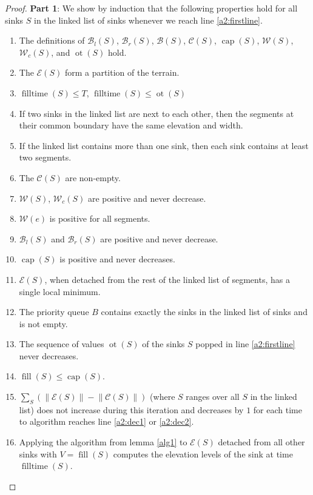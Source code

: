 \documentclass[11pt,a4paper]{article}
\newcommand{\norm}[1]{\left\lVert #1 \right\rVert}
\DeclareMathOperator{\capp}{cap}
\DeclareMathOperator{\ot}{ot}
\DeclareMathOperator{\Fill}{fill}
\DeclareMathOperator{\filltime}{filltime}
\begin{document}
\begin{proof}
\textbf{Part 1}:
We show by induction that the following properties hold for all sinks $S$ in the linked list of sinks whenever we reach line \ref{a2:firstline}.
\begin{enumerate}[label=\textbf{\Roman*}]
\item The definitions of $\mathcal{B}_l(S)$, $\mathcal{B}_r(S)$, $\mathcal{B}(S)$, $\mathcal{C}(S)$, $\capp(S)$, $\mathcal{W}(S)$, $\mathcal{W}_c(S)$, and $\ot(S)$ hold.\label{e1}
\item The $\mathcal{E}(S)$ form a partition of the terrain.\label{e2}
\item $\filltime(S) \le T$, $\filltime(S) \le \ot(S)$\label{e3}
\item If two sinks in the linked list are next to each other, then the segments at their common boundary have the same elevation and width.\label{e4} 
\item If the linked list contains more than one sink, then each sink contains at least two segments.\label{e6}
\item The $\mathcal{C}(S)$ are non-empty.\label{e7}
\item $\mathcal{W}(S)$, $\mathcal{W}_c(S)$ are positive and never decrease.\label{e8}
\item $\mathcal{W}(e)$ is positive for all segments.\label{e9}
\item $\mathcal{B}_l(S)$ and $\mathcal{B}_r(S)$ are positive and never decrease.\label{e10}
\item $\capp(S)$ is positive and never decreases.\label{e11}
\item $\mathcal{E}(S)$, when detached from the rest of the linked list of segments, has a single local minimum.\label{e12}
\item The priority queue $B$ contains exactly the sinks in the linked list of sinks and is not empty.\label{e13}
\item The sequence of values $\ot(S)$ of the sinks $S$ popped in line \ref{a2:firstline} never decreases.\label{e15}
\item $\Fill(S) \le \capp(S)$.\label{e16}
\item $\sum_S\left(\norm{\mathcal{E}(S)} - \norm{\mathcal{C}(S)}\right)$ (where $S$ ranges over all $S$ in the linked list) does not increase during this iteration and decreases by $1$ for each time to algorithm reaches line \ref{a2:dec1} or \ref{a2:dec2}.\label{e17}
\item Applying the algorithm from lemma \ref{alg1} to $\mathcal{E}(S)$ detached from all other sinks with $V=\Fill(S)$ computes the elevation levels of the sink at time $\filltime(S)$.\label{e18}
\end{enumerate}


\end{proof}
\end{document}
